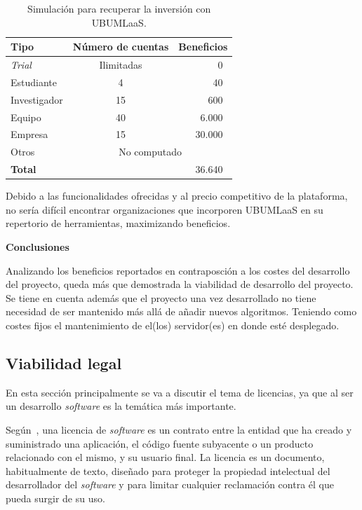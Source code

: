 \begin{table}[H]
\centering
\begin{tabular}{lcr}
	\toprule
	\textbf{Tipo}     & \textbf{Número de cuentas} & \textbf{Beneficios}\\
	\midrule
	\textit{Trial}        & Ilimitadas & 0~\officialeuro\\
	Estudiante   & 4 & 40~\officialeuro\\
	Investigador  & 15 & 600~\officialeuro\\
	Equipo  & 40 & 6.000~\officialeuro\\
	Empresa & 15 & 30.000~\officialeuro\\
	Otros & \multicolumn{2}{c}{No computado} \\
	\midrule
	\textbf{Total} &&36.640~\officialeuro \\
	\bottomrule
\end{tabular}
\caption{Simulación para recuperar la inversión con UBUMLaaS.}\label{tab:simulacion-clientes}
\end{table}

Debido a las funcionalidades ofrecidas y al precio competitivo de la plataforma, no sería difícil encontrar organizaciones que incorporen UBUMLaaS en su repertorio de herramientas, maximizando beneficios.

\textbf{Conclusiones}

Analizando los beneficios reportados en contraposción a los costes del desarrollo del proyecto, queda más que demostrada la viabilidad de desarrollo del proyecto. Se tiene en cuenta además que el proyecto una vez desarrollado no tiene necesidad de ser mantenido más allá de añadir nuevos algoritmos. Teniendo como costes fijos el mantenimiento de el(los) servidor(es) en donde esté desplegado.

\subsection{Viabilidad legal}

En esta sección principalmente se va a discutir el tema de licencias, ya que al ser un desarrollo \textit{software} es la temática más importante.

Según~\cite{softwareLicense}, una licencia de \textit{software} es un contrato entre la entidad que ha creado y suministrado una aplicación, el código fuente subyacente o un producto relacionado con el mismo, y su usuario final.  La licencia es un documento, habitualmente de texto, diseñado para proteger la propiedad intelectual del desarrollador del \textit{software} y para limitar cualquier reclamación contra él que pueda surgir de su uso.

